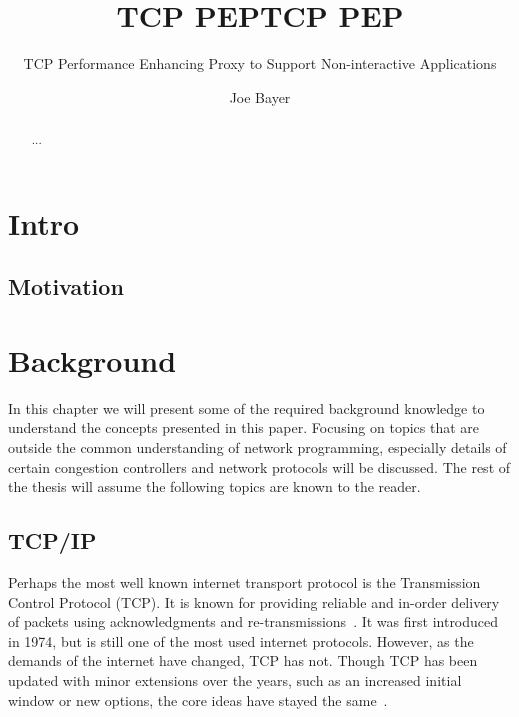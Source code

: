 \documentclass[a4paper,english, 11pt]{report}
\author{Joe Bayer}
\title{TCP PEP}
\subtitle{TCP Performance Enhancing Proxy to Support Non-interactive Applications}
\title{TCP PEP}
\begin{document}
 \uiomasterfp[program={Informatics: Programming and System Architecture}, supervisors={Michael Welzl\and Kristjon Ciko}]
\tableofcontents


\listoffigures
{}

\begin{abstract}
   ...
\end{abstract}

\chapter{Intro}

\section{Motivation}

\chapter{Background}

In this chapter we will present some of the required background knowledge to understand the concepts presented in this paper. Focusing on topics that are outside the common understanding of network programming, especially details of certain congestion controllers and network protocols will be discussed. The rest of the thesis will assume the following topics are known to the reader.\\

\section{TCP/IP}
Perhaps the most well known internet transport protocol is the Transmission Control Protocol (TCP). It is known for providing reliable and in-order delivery of packets using acknowledgments and re-transmissions~\cite{Eddy_2022}. It was first introduced in 1974, but is still one of the most used internet protocols. However, as the demands of the internet have changed, TCP has not. Though TCP has been updated with minor extensions over the years, such as an increased initial window or new options, the core ideas have stayed the same~\cite{rfc8803}.\\
\end{document}
